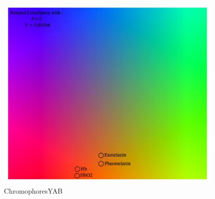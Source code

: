 \begin{figure}[h!]
  \centering
    \includegraphics[width=0.99\textwidth]{Chapter1/Figs/ChromophoresYAB.jpg}
    \caption{ChromophoresYAB }  \label{fig:ChromophoresYAB}
\end{figure}